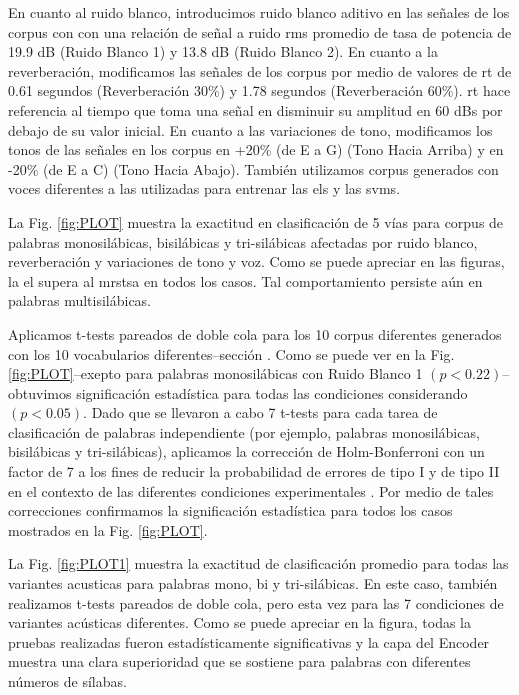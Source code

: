 {En cuanto al ruido blanco, introducimos ruido blanco aditivo en las señales de los corpus con con una relación de señal a ruido \gls{rms} promedio de tasa de potencia de 19.9 dB (Ruido Blanco 1) y 13.8 dB (Ruido Blanco 2). En cuanto a la reverberación, modificamos las señales de los corpus por medio de valores de \gls{rt} de 0.61 segundos (Reverberación 30\%) y 1.78 segundos (Reverberación 60\%). \gls{rt} hace referencia al tiempo que toma una señal en disminuir su amplitud en 60 dBs por debajo de su valor inicial. En cuanto a las variaciones de tono, modificamos los tonos de las señales en los corpus en +20\% (de E a G) (Tono Hacia Arriba) y en -20\% (de E a C) (Tono Hacia Abajo). También utilizamos corpus generados con voces diferentes a las utilizadas para entrenar las \glspl{el} y las \glspl{svm}.

La Fig. \ref{fig:PLOT} muestra la exactitud en clasificación de 5 vías para corpus de palabras monosilábicas, bisilábicas y tri-silábicas afectadas por ruido blanco, reverberación y variaciones de tono y voz. Como se puede apreciar en las figuras, la \gls{el} supera al \gls{mrstsa} en todos los casos. Tal comportamiento persiste aún en palabras multisilábicas.

Aplicamos t-tests pareados de doble cola para los 10 corpus diferentes generados con los 10 vocabularios diferentes--sección . Como se puede ver en la Fig. \ref{fig:PLOT}--exepto para palabras monosilábicas con Ruido Blanco 1 $(p < 0.22)$--obtuvimos significación estadística para todas las condiciones considerando $(p<0.05)$. 
Dado que se llevaron a cabo 7 t-tests para cada tarea de clasificación de palabras independiente (por ejemplo, palabras monosilábicas, bisilábicas y tri-silábicas), aplicamos la corrección de Holm-Bonferroni con un factor de 7 a los fines de reducir la probabilidad de errores de tipo I y de tipo II en el contexto de las diferentes condiciones experimentales \cite{10.1093/biomet/75.2.383}. Por medio de tales correcciones confirmamos la significación estadística para todos los casos mostrados en la Fig. \ref{fig:PLOT}.

La Fig. \ref{fig:PLOT1} muestra la exactitud de clasificación promedio para todas las variantes acusticas para palabras mono, bi y tri-silábicas.
En este caso, también realizamos t-tests pareados de doble cola, pero esta vez para las 7 condiciones de variantes acústicas diferentes.
Como se puede apreciar en la figura, todas la pruebas realizadas fueron estadísticamente significativas  y la capa del Encoder muestra una clara superioridad que se sostiene para palabras con diferentes números de sílabas.

}
